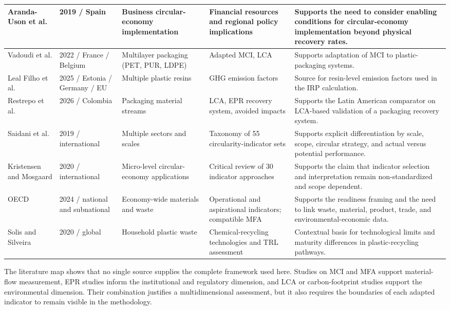 \documentclass[review,10pt]{elsarticle}
\newcommand{\revpar}[1]{#1\par\medskip}
\begin{document}
{\begin{longtable}{|L{2cm}|L{2cm}|L{2.45cm}|L{2.55cm}|L{5cm}|}
Aranda-Uson et al. & 2019 / Spain & Business circular-economy implementation &
Financial resources and regional policy implications &
Supports the need to consider enabling conditions for circular-economy implementation beyond physical recovery rates. \\
\hline

Vadoudi et al. & 2022 / France / Belgium & Multilayer packaging (PET, PUR, LDPE) &
Adapted MCI, LCA &
Supports adaptation of MCI to plastic-packaging systems. \\
\hline

Leal Filho et al. & 2025 / Estonia / Germany / EU & Multiple plastic resins &
GHG emission factors &
Source for resin-level emission factors used in the IRP calculation. \\
\hline

Restrepo et al. & 2026 / Colombia & Packaging material streams &
LCA, EPR recovery system, avoided impacts &
Supports the Latin American comparator on LCA-based validation of a packaging recovery system. \\
\hline

Saidani et al. & 2019 / international & Multiple sectors and scales &
Taxonomy of 55 circularity-indicator sets &
Supports explicit differentiation by scale, scope, circular strategy, and actual versus potential performance. \\
\hline

Kristensen and Mosgaard & 2020 / international & Micro-level circular-economy applications &
Critical review of 30 indicator approaches &
Supports the claim that indicator selection and interpretation remain non-standardized and scope dependent. \\
\hline

OECD & 2024 / national and subnational & Economy-wide materials and waste &
Operational and aspirational indicators; compatible MFA &
Supports the readiness framing and the need to link waste, material, product, trade, and environmental-economic data. \\
\hline

Solis and Silveira & 2020 / global & Household plastic waste &
Chemical-recycling technologies and TRL assessment &
Contextual basis for technological limits and maturity differences in plastic-recycling pathways. \\
\hline

\end{longtable}
}

\revpar{The literature map shows that no single source supplies the complete framework used here. Studies on MCI and MFA support material-flow measurement, EPR studies inform the institutional and regulatory dimension, and LCA or carbon-footprint studies support the environmental dimension. Their combination justifies a multidimensional assessment, but it also requires the boundaries of each adapted indicator to remain visible in the methodology.}
\end{document}

